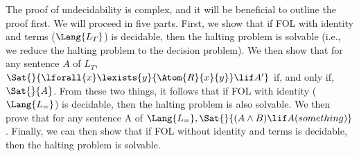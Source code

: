 \documentclass[../../include/open-logic-section]{subfiles}
\begin{document}

\begin{explain}
The proof of undecidability is complex, and it will be beneficial to outline the proof first. We will proceed in five parts. First, we show that if FOL with identity and terms ($\Lang{L_T}$) is decidable, then the halting problem is solvable (i.e., we reduce the halting problem to the decision problem). We then show that for any sentence $A$ of $L_T$, $\Sat{}{\lforall{x}\lexists{y}{\Atom{R}{x}{y}}\lif A'}$ if, and only if, $\Sat{}{A}$. From these two things, it follows that if FOL with identity ($\Lang{L_=}$) is decidable, then the halting problem is also solvable. We then prove that for any sentence A of $\Lang{L_=} , \Sat{}{(A \land B) \lif A (something)}$. Finally, we can then show that if FOL without identity and terms is decidable, then the halting problem is solvable.
\end{explain}
\end{document}

